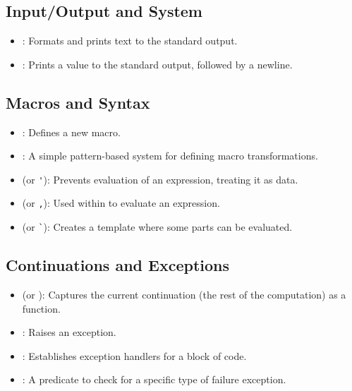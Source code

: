 \subsection{Input/Output and System}
\begin{itemize}
    \item {}: Formats and prints text to the standard output.
    \item {}: Prints a value to the standard output, followed by a newline.
\end{itemize}

\subsection{Macros and Syntax}
\begin{itemize}
    \item {}: Defines a new macro.
    \item {}: A simple pattern-based system for defining macro transformations.
    \item {} (or \verb|'|): Prevents evaluation of an expression, treating it as data.
    \item {} (or \verb|,|): Used within  to evaluate an expression.
    \item {} (or \verb|`|): Creates a template where some parts can be evaluated.
\end{itemize}

\subsection{Continuations and Exceptions}
\begin{itemize}
    \item {} (or ): Captures the current continuation (the rest of the computation) as a function.
    \item {}: Raises an exception.
    \item {}: Establishes exception handlers for a block of code.
    \item {}: A predicate to check for a specific type of failure exception.
\end{itemize}
